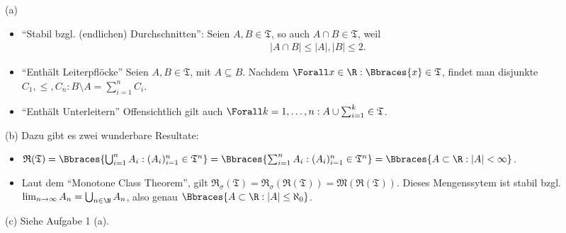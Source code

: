 \begin{solution}

(a) \phantom{}

\begin{itemize}

  \item \enquote{Stabil bzgl. (endlichen) Durchschnitten}: Seien $A, B \in \mathfrak{T}$, so auch $A \cap B \in \mathfrak{T}$, weil
  \begin{align*}
    |A \cap B| \leq |A|, |B| \leq 2.
  \end{align*}

  \item \enquote{Enthält Leiterpflöcke} Seien $A, B \in \mathfrak{T}$, mit $A \subseteq B$. Nachdem $\Forall x \in \R: \Bbraces{x} \in \mathfrak{T}$, findet man disjunkte $C_1, \leq, C_n: B \setminus A = \sum_{i=1}^n C_i$.

  \item \enquote{Enthält Unterleitern} Offensichtlich gilt auch $\Forall k = 1, \ldots, n: A \cup \sum_{i=1}^k \in \mathfrak{T}$.

\end{itemize}

(b) Dazu gibt es zwei wunderbare Resultate:

\begin{itemize}

  \item $\mathfrak{R}(\mathfrak{T})
  = \Bbraces{\bigcup_{i=1}^n A_i: (A_i)_{i=1}^n \in \mathfrak{T}^n}
  = \Bbraces{\sum   _{i=1}^n A_i: (A_i)_{i=1}^n \in \mathfrak{T}^n}
  = \Bbraces{A \subset \R: |A| < \infty}$.

  \item Laut dem \enquote{Monotone Class Theorem}, gilt
  $\mathfrak{R}_\sigma(\mathfrak{T})
  = \mathfrak{R}_\sigma(\mathfrak{R}(\mathfrak{T}))
  = \mathfrak{M}(\mathfrak{R}(\mathfrak{T}))$.
  Dieses Mengenssytem ist stabil bzgl. $\lim_{n \to \infty} A_n = \bigcup_{n \in \N} A_n$, also genau $\Bbraces{A \subset \R: |A| \leq \aleph_0}$.

\end{itemize}

(c) Siehe Aufgabe 1 (a).

\end{solution}

